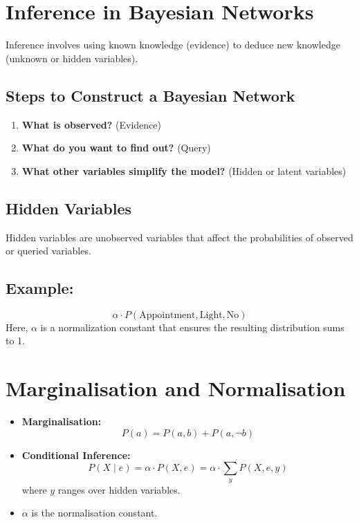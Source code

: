 

\section{Inference in Bayesian Networks}

Inference involves using known knowledge (evidence) to deduce new knowledge (unknown or hidden variables).

\subsection*{Steps to Construct a Bayesian Network}

\begin{enumerate}
    \item \textbf{What is observed?} (Evidence)
    \item \textbf{What do you want to find out?} (Query)
    \item \textbf{What other variables simplify the model?} (Hidden or latent variables)
\end{enumerate}

\subsection*{Hidden Variables}
Hidden variables are unobserved variables that affect the probabilities of observed or queried variables.

\subsection*{Example:}
\[
\alpha \cdot P(\text{Appointment}, \text{Light}, \text{No})
\]
Here, \( \alpha \) is a normalization constant that ensures the resulting distribution sums to 1.

\section{Marginalisation and Normalisation}

\begin{itemize}
    \item \textbf{Marginalisation:}
    \[
    P(a) = P(a, b) + P(a, \neg b)
    \]
    \item \textbf{Conditional Inference:}
    \[
    P(X \mid e) = \alpha \cdot P(X, e) = \alpha \cdot \sum_y P(X, e, y)
    \]
    where \( y \) ranges over hidden variables.
    \item \( \alpha \) is the normalisation constant.
\end{itemize}

